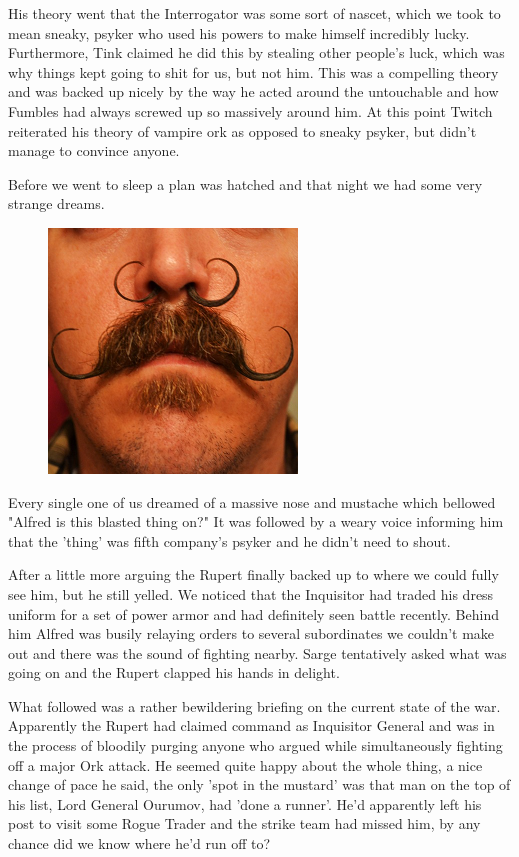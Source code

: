 His theory went that the Interrogator was some sort of nascet, which we took to mean sneaky, psyker who used his powers to make himself incredibly lucky. 
Furthermore, Tink claimed he did this by stealing other people's luck, which was why things kept going to shit for us, but not him. 
This was a compelling theory and was backed up nicely by the way he acted around the untouchable and how Fumbles had always screwed up so massively around him. 
At this point Twitch reiterated his theory of vampire ork as opposed to sneaky psyker, but didn't manage to convince anyone.

Before we went to sleep a plan was hatched and that night we had some very strange dreams.

\begin{figure}
	\begin{center}
		\includegraphics[width=\figwidth]{pics/9/44.png}
	\end{center}
\end{figure}
Every single one of us dreamed of a massive nose and mustache which bellowed "Alfred is this blasted thing on?" It was followed by a weary voice informing him that the 'thing' was fifth company's psyker and he didn't need to shout.

After a little more arguing the Rupert finally backed up to where we could fully see him, but he still yelled. 
We noticed that the Inquisitor had traded his dress uniform for a set of power armor and had definitely seen battle recently. 
Behind him Alfred was busily relaying orders to several subordinates we couldn't make out and there was the sound of fighting nearby. 
Sarge tentatively asked what was going on and the Rupert clapped his hands in delight.

What followed was a rather bewildering briefing on the current state of the war. 
Apparently the Rupert had claimed command as Inquisitor General and was in the process of bloodily purging anyone who argued while simultaneously fighting off a major Ork attack. 
He seemed quite happy about the whole thing, a nice change of pace he said, the only 'spot in the mustard' was that man on the top of his list, Lord General Ourumov, had 'done a runner'. 
He'd apparently left his post to visit some Rogue Trader and the strike team had missed him, by any chance did we know where he'd run off to?

